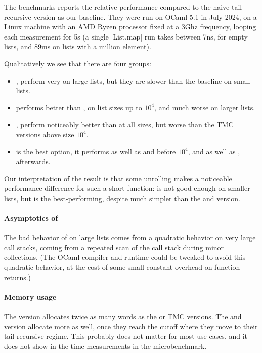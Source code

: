 The benchmarks reports the relative performance compared to the naive tail-recursive version as our baseline. They were run on OCaml 5.1 in July 2024, on a Linux machine with an AMD Ryzen processor fixed at a 3Ghz frequency, looping each measurement for 5s (a single \ocaml|List.map| run takes between 7ns, for empty lists, and 89ms on lists with a million element).

Qualitatively we see that there are four groups:
\begin{itemize}
\item {},  perform very on large lists, but they
  are slower than the baseline on small lists.
\item {} performs better than ,  on list sizes up to $10^4$, and much worse on larger lists.
\item {},  perform noticeably better than  at all sizes,
  but worse than the TMC versions above size $10^4$.
\item {} is the best option, it performs as well as  and  before $10^4$, and as well as ,  afterwards.
\end{itemize}
Our interpretation of the result is that some unrolling makes a noticeable performance difference for such a short function:  is not good enough on smaller lists, but  is the best-performing, despite much simpler than the  and  version.

\paragraph{Asymptotics of } The bad behavior of  on large lists comes from a quadratic behavior on very large call stacks, coming from a repeated scan of the call stack during minor collections. (The OCaml compiler and runtime could be tweaked to avoid this quadratic behavior, at the cost of some small constant overhead on function returns.)

\paragraph{Memory usage} The  version allocates twice as many words as the  or TMC versions. The  and  version allocate more as well, once they reach the cutoff where they move to their tail-recursive regime. This probably does not matter for most use-cases, and it does not show in the time measurements in the microbenchmark.

